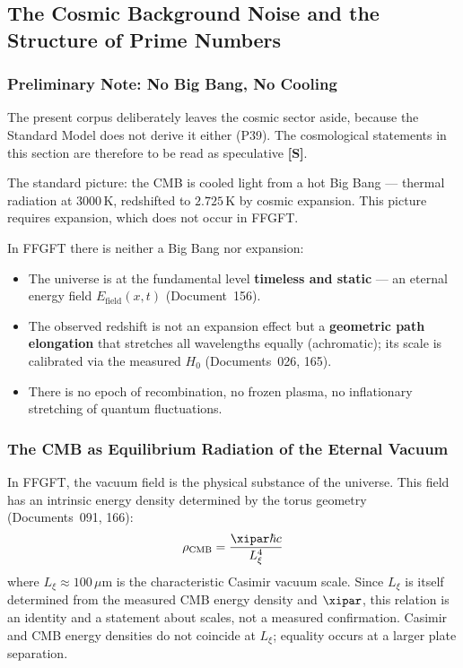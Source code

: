 \subsection{The Cosmic Background Noise and the Structure of Prime Numbers}

\subsubsection*{Preliminary Note: No Big Bang, No Cooling}

\begin{important}
The present corpus deliberately leaves the cosmic sector aside, because the
Standard Model does not derive it either (P39). The cosmological statements in
this section are therefore to be read as speculative \textbf{[S]}.

The standard picture: the CMB is cooled light from a hot Big Bang —
thermal radiation at $3000\,\text{K}$, redshifted to $2.725\,\text{K}$
by cosmic expansion. This picture requires expansion, which does not occur
in FFGFT.

In FFGFT there is neither a Big Bang nor expansion:
\begin{itemize}
    \item The universe is at the fundamental level \textbf{timeless and static}
    — an eternal energy field $E_\text{field}(x,t)$ (Document~156).
    \item The observed redshift is not an expansion effect but a
    \textbf{geometric path elongation} that stretches all wavelengths equally
    (achromatic); its scale is calibrated via the measured $H_0$
    (Documents~026, 165).
    \item There is no epoch of recombination, no frozen plasma,
    no inflationary stretching of quantum fluctuations.
\end{itemize}
\end{important}

\subsubsection*{The CMB as Equilibrium Radiation of the Eternal Vacuum}

In FFGFT, the vacuum field is the physical substance of the universe.
This field has an intrinsic energy density determined by the torus
geometry (Documents~091, 166):
\begin{equation}
    \rho_\text{CMB} = \frac{\xipar \hbar c}{L_\xi^4}
\end{equation}
where $L_\xi \approx 100\,\mu\text{m}$ is the characteristic Casimir
vacuum scale. Since $L_\xi$ is itself determined from the measured CMB energy
density and $\xipar$, this relation is an identity and a statement about scales,
not a measured confirmation. Casimir and CMB energy densities do not coincide at
$L_\xi$; equality occurs at a larger plate separation.

